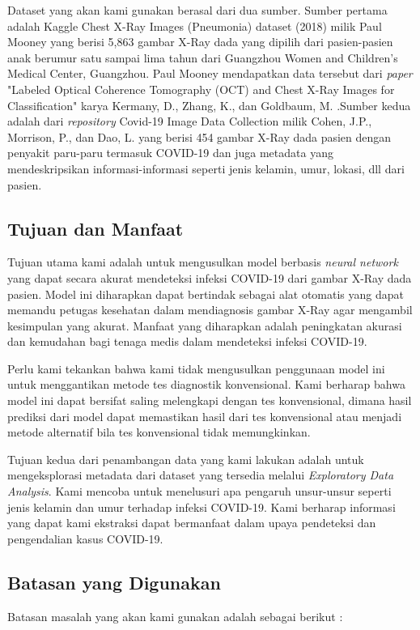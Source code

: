 \documentclass{article}
\begin{document}
	   Dataset yang akan kami gunakan berasal dari dua sumber. Sumber pertama adalah  Kaggle Chest X-Ray Images (Pneumonia) dataset (2018) milik Paul Mooney \cite{mooney} yang berisi 5,863 gambar X-Ray dada yang dipilih dari pasien-pasien anak berumur satu sampai lima tahun dari Guangzhou Women and Children’s Medical Center, Guangzhou. Paul Mooney mendapatkan data tersebut dari \textit{paper} "Labeled Optical Coherence Tomography (OCT) and Chest X-Ray Images for Classification" karya Kermany, D., Zhang, K., dan Goldbaum, M. \cite{kermany}.Sumber kedua adalah dari \textit{repository} Covid-19 Image Data Collection milik Cohen, J.P., Morrison, P., dan Dao, L. \cite{cohen} yang berisi 454 gambar X-Ray dada pasien dengan penyakit paru-paru termasuk COVID-19 dan juga metadata yang mendeskripsikan informasi-informasi seperti jenis kelamin, umur, lokasi, dll dari pasien. 
	   
	   \subsection{Tujuan dan Manfaat}
	   Tujuan utama kami adalah untuk mengusulkan model berbasis \textit{neural network} yang dapat secara akurat mendeteksi infeksi COVID-19 dari gambar X-Ray dada pasien. Model ini diharapkan dapat bertindak sebagai alat otomatis yang dapat memandu petugas kesehatan dalam mendiagnosis gambar X-Ray agar mengambil kesimpulan yang akurat. Manfaat yang diharapkan adalah peningkatan akurasi dan kemudahan bagi tenaga medis dalam mendeteksi infeksi COVID-19. 
	   \par
	   Perlu kami tekankan bahwa kami tidak mengusulkan penggunaan model ini untuk menggantikan metode tes diagnostik konvensional. Kami berharap bahwa model ini dapat bersifat saling melengkapi dengan tes konvensional, dimana hasil prediksi dari model dapat memastikan hasil dari tes konvensional atau menjadi metode alternatif bila tes konvensional tidak memungkinkan. 
	   \par
	   Tujuan kedua dari penambangan data yang kami lakukan adalah untuk mengeksplorasi metadata dari dataset yang tersedia melalui \textit{Exploratory Data Analysis}. Kami mencoba untuk menelusuri apa pengaruh unsur-unsur seperti jenis kelamin dan umur terhadap infeksi COVID-19. Kami berharap informasi yang dapat kami ekstraksi dapat bermanfaat dalam upaya pendeteksi dan pengendalian kasus COVID-19.
	   
	   \subsection{Batasan yang Digunakan}
	   Batasan masalah yang akan kami gunakan adalah sebagai berikut :
	   
\end{document}
